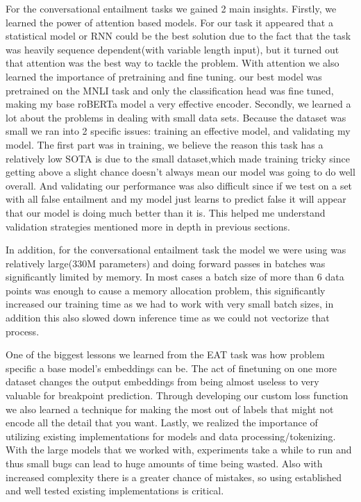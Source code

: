 \documentclass[11pt,a4paper]{article}
\begin{document}
For the conversational entailment tasks we gained 2 main insights. Firstly, we learned the power of attention based models. For our task it appeared that a statistical model or RNN could be the best solution due to the fact that the task was heavily sequence dependent(with variable length input), but it turned out that attention was the best way to tackle the problem. With attention we  also learned the importance of pretraining and fine tuning. our best model was pretrained on the MNLI task and only the classification head was fine tuned, making my base roBERTa model a very effective encoder. Secondly, we learned a lot about the problems in dealing with small data sets. Because the dataset was small we ran into 2 specific issues: training an effective model, and validating my model. The first part was in training, we believe the reason this task has a relatively low SOTA is due to the small dataset,which made training tricky since getting above a slight chance doesn't always mean our model was going to do well overall. And validating our performance was also difficult since if we test on a set with all false entailment and my model just learns to predict false it will appear that our model is doing much better than it is. This helped me understand validation strategies mentioned more in depth in previous sections.  

In addition, for the conversational entailment task the model we were using was relatively large(330M parameters) and doing forward passes in batches was significantly limited by memory. In most cases a batch size of more than 6 data points was enough to cause a memory allocation problem, this significantly increased our training time as we had to work with very small batch sizes, in addition this also slowed down inference time as we could not vectorize that process. 


One of the biggest lessons we learned from the EAT task was how problem specific a base model's embeddings can be. The act of finetuning on one more dataset changes the output embeddings from being almost useless to very valuable for breakpoint prediction. Through developing our custom loss function we also learned a technique for making the most out of labels that might not encode all the detail that you want. Lastly, we realized the importance of utilizing existing implementations for models and data processing/tokenizing. With the large models that we worked with, experiments take a while to run and thus small bugs can lead to huge amounts of time being wasted. Also with increased complexity there is a greater chance of mistakes, so using established and well tested existing implementations is critical.




\appendix
\end{document}
